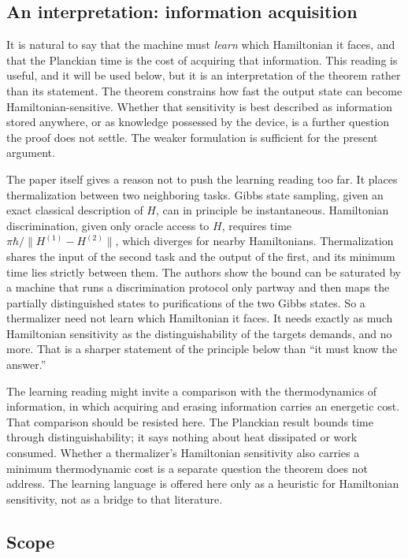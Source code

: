 \documentclass[11pt]{article}
\theoremstyle{definition}
\begin{document}
\subsection{An interpretation: information acquisition}

It is natural to say that the machine must \emph{learn} which Hamiltonian it faces, and that the Planckian time is the cost of acquiring that information. This reading is useful, and it will be used below, but it is an interpretation of the theorem rather than its statement. The theorem constrains how fast the output state can become Hamiltonian-sensitive. Whether that sensitivity is best described as information stored anywhere, or as knowledge possessed by the device, is a further question the proof does not settle. The weaker formulation is sufficient for the present argument.

The paper itself gives a reason not to push the learning reading too far. It places thermalization between two neighboring tasks. Gibbs state sampling, given an exact classical description of $H$, can in principle be instantaneous. Hamiltonian discrimination, given only oracle access to $H$, requires time $\pi\hbar/\|H^{(1)}-H^{(2)}\|$, which diverges for nearby Hamiltonians. Thermalization shares the input of the second task and the output of the first, and its minimum time lies strictly between them. The authors show the bound can be saturated by a machine that runs a discrimination protocol only partway and then maps the partially distinguished states to purifications of the two Gibbs states. So a thermalizer need not learn which Hamiltonian it faces. It needs exactly as much Hamiltonian sensitivity as the distinguishability of the targets demands, and no more. That is a sharper statement of the principle below than ``it must know the answer.''

The learning reading might invite a comparison with the thermodynamics of information, in which acquiring and erasing information carries an energetic cost. That comparison should be resisted here. The Planckian result bounds time through distinguishability; it says nothing about heat dissipated or work consumed. Whether a thermalizer's Hamiltonian sensitivity also carries a minimum thermodynamic cost is a separate question the theorem does not address. The learning language is offered here only as a heuristic for Hamiltonian sensitivity, not as a bridge to that literature.

\subsection{Scope}
\end{document}
